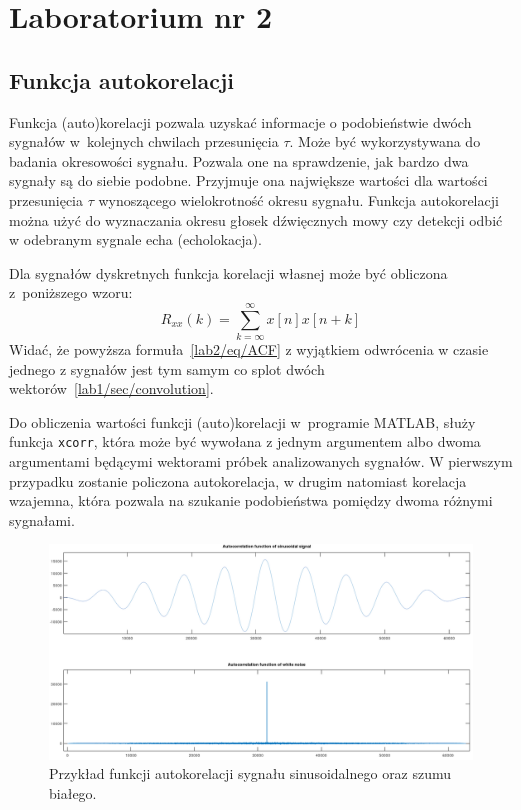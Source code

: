 \section{Laboratorium nr 2}

\subsection{Funkcja autokorelacji}
Funkcja (auto)korelacji pozwala uzyskać informacje o podobieństwie dwóch sygnałów w~kolejnych chwilach przesunięcia $\tau$. Może być wykorzystywana do badania okresowości sygnału. Pozwala one na sprawdzenie, jak bardzo dwa sygnały są do siebie podobne. Przyjmuje ona największe wartości dla wartości przesunięcia $\tau$ wynoszącego wielokrotność okresu sygnału. Funkcja autokorelacji można użyć do wyznaczania okresu głosek dźwięcznych mowy czy detekcji odbić w odebranym sygnale echa (echolokacja).

Dla sygnałów dyskretnych funkcja korelacji własnej może być obliczona z~poniższego wzoru:
\begin{equation}\label{lab2/eq/ACF}
	R_{xx}(k) = \sum_{k=\infty}^{\infty} x[n]x[n+k]
\end{equation}
Widać, że powyższa formuła~\ref{lab2/eq/ACF} z wyjątkiem odwrócenia w czasie jednego z sygnałów jest tym samym co splot dwóch wektorów~\ref{lab1/sec/convolution}. 

Do obliczenia wartości funkcji (auto)korelacji w~programie MATLAB, służy funkcja \texttt{xcorr}, która może być wywołana z jednym argumentem albo dwoma argumentami będącymi wektorami próbek analizowanych sygnałów. W pierwszym przypadku zostanie policzona autokorelacja, w drugim natomiast korelacja wzajemna, która pozwala na szukanie podobieństwa pomiędzy dwoma różnymi sygnałami. 

\begin{figure}[hbt!]
	\centering
	\includegraphics[width=0.9\linewidth]{images/xcorrFunction.png}
	\caption{Przykład funkcji autokorelacji sygnału sinusoidalnego oraz szumu białego.}
	\label{lab2/fig/xcorrFunction}
\end{figure}

